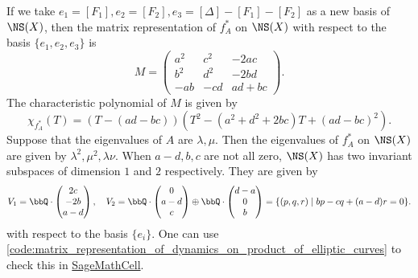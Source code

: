     If we take \(e_1= [F_1],e_2=[F_2],e_3=[\Delta]-[F_1]-[F_2]\) as a new basis of \(\NS(X)\), then the matrix representation of \(f_A^*\) on \(\NS(X)\) with respect to the basis \(\{e_1,e_2,e_3\}\) is
    \[
        M = \begin{pmatrix}
            a^2 & c^2 & -2ac \\
            b^2 & d^2 & -2bd \\
            -ab & -cd & ad+bc
        \end{pmatrix}.
    \]
    The characteristic polynomial of \(M\) is given by
    \[ \chi_{f_A^*}(T) = (T - (ad-bc))(T^2 - (a^2+d^2+2bc)T + (ad-bc)^2). \]
    Suppose that the eigenvalues of \(A\) are \(\lambda, \mu\).
    Then the eigenvalues of \(f_A^*\) on \(\NS(X)\) are given by \(\lambda^2, \mu^2, \lambda \nu\).
    When \(a-d,b,c\) are not all zero, \(\NS(X)\) has two invariant subspaces of dimension \(1\) and \(2\) respectively.
    They are given by 
    \[ V_1 = \bbQ \cdot \begin{pmatrix}
        2c \\
        -2b \\
        a-d
    \end{pmatrix}, \quad V_2 = \bbQ \cdot \begin{pmatrix}
        0 \\
        a-d \\
        c
    \end{pmatrix} \oplus \bbQ \cdot \begin{pmatrix}
        d-a \\
        0 \\
        b
    \end{pmatrix} = \{(p,q,r) \mid bp-cq+(a-d)r=0\}. \]
    with respect to the basis \(\{e_i\}\).
    One can use \cref{code:matrix_representation_of_dynamics_on_product_of_elliptic_curves} to check this in \href{https://sagecell.sagemath.org/}{SageMathCell}.

